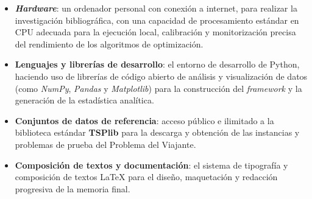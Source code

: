 \documentclass[11pt,a4paper,oneside]{article}
\begin{document}
\begin{itemize}
  \item \textbf{\textit{Hardware}}: un ordenador personal con conexión a internet, para realizar la investigación bibliográfica, con 
  una capacidad de procesamiento estándar en CPU adecuada para la ejecución local, calibración y monitorización precisa del rendimiento 
  de los algoritmos de optimización.
  \item \textbf{Lenguajes y librerías de desarrollo}: el entorno de desarrollo de Python, haciendo uso de librerías de código abierto de 
  análisis y visualización de datos (como \textit{NumPy}, \textit{Pandas} y \textit{Matplotlib}) para la construcción del \textit{framework}
  y la generación de la estadística analítica.
  \item \textbf{Conjuntos de datos de referencia}: acceso público e ilimitado a la biblioteca estándar \textbf{TSPlib} para la descarga y 
  obtención de las instancias y problemas de prueba del Problema del Viajante. 
  \item \textbf{Composición de textos y documentación}: el sistema de tipografía y composición de textos \LaTeX{} para el diseño, maquetación 
  y redacción progresiva de la memoria final.
\end{itemize}


% 


\end{document}
